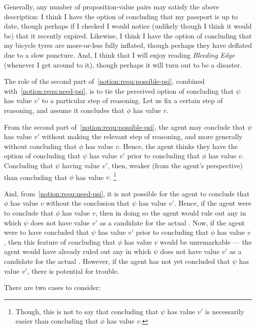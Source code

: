 \begin{note}[Expanding]
  Generally, any number of proposition-value pairs may satisfy the above description:
  I think I have the option of concluding that my passport is up to date, though perhaps if I checked I would notice (unlikely though I think it would be) that it recently expired.
  Likewise, I think I have the option of concluding that my bicycle tyres are more-or-less fully inflated, though perhaps they have deflated due to a slow puncture.
  And, I think that I will enjoy reading \emph{Bleeding Edge} (whenever I get around to it), though perhaps it will turn out to be a disaster.

  The role of the second part of~\ref{notion:requ:possible-psi}, combined with~\ref{notion:requ:need-psi}, is to tie the perceived option of concluding that \(\psi\) has value \(v'\) to a particular step of reasoning.
  Let us fix a certain step of reasoning, and assume it concludes that \(\phi\) has value \(v\).

  From the second part of~\ref{notion:requ:possible-psi}, the agent may conclude that \(\psi\) has value \(v'\) without making the relevant step of reasoning, and more generally without concluding that \(\phi\) has value \(v\).
  Hence, the agent thinks they have the option of concluding that \(\psi\) has value \(v'\) prior to concluding that \(\phi\) has value \(v\).
  Concluding that \(\psi\) having value \(v'\), then, weaker (from the agent's perspective) than concluding that \(\phi\) has value \(v\).\nolinebreak
  \footnote{
    Though, this is not to say that concluding that \(\psi\) has value \(v'\) is necessarily easier than concluding that \(\phi\) has value \(v\).
  }

  And, from~\ref{notion:requ:need-psi}, it is not possible for the agent to conclude that \(\phi\) has value \(v\) without the conclusion \indicateV{} that \(\psi\) has value \(v'\).
  Hence, if the agent were to conclude that \(\phi\) has value \(v\), then in doing so the agent would rule out any \world{} in which \(\psi\) does not have value \(v'\) as a candidate for the actual \world{}.
  Now, if the agent were to have concluded that \(\psi\) has value \(v'\) prior to concluding that \(\phi\) has value \(v\), then this feature of concluding that \(\phi\) has value \(v\) would be unremarkable --- the agent would have already ruled out any \world{} in which \(\psi\) does not have value \(v'\) as a candidate for the actual \world{}.
  However, if the agent has not yet concluded that \(\psi\) has value \(v'\), there is potential for trouble.

  There are two cases to consider:
\end{note}

